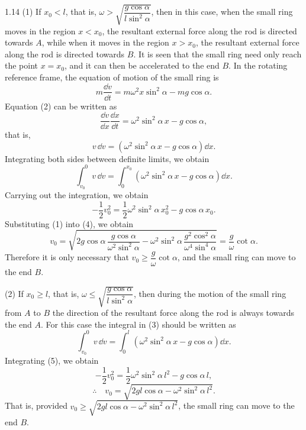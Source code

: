 \begin{solution}{1.14}
(1) If $x_0<l$, that is, $\omega>\sqrt{\dfrac{g\cos\alpha}{l\sin^2\alpha}}$, then in this case, when the small ring moves in the region $x<x_0$, the resultant external force along the rod is directed towards $A$, while when it moves in the region $x>x_0$, the resultant external force along the rod is directed towards $B$. It is seen that the small ring need only reach the point $x=x_0$, and it can then be accelerated to the end $B$. In the rotating reference frame, the equation of motion of the small ring is
\begin{equation}
m\frac{\dd v}{\dd t}=m\omega^2x\sin^2\alpha-mg\cos\alpha. \tag{2}
\end{equation}
Equation (2) can be written as
\[
\frac{\dd v}{\dd x}\frac{\dd x}{\dd t}=\omega^2\sin^2\alpha\,x-g\cos\alpha,
\]
that is,
\[
v\,\dd v=\left(\omega^2\sin^2\alpha\,x-g\cos\alpha\right)\dd x.
\]
Integrating both sides between definite limits, we obtain
\begin{equation}
\int_{v_0}^{0}v\,\dd v=\int_{0}^{x_0}\left(\omega^2\sin^2\alpha\,x-g\cos\alpha\right)\dd x. \tag{3}
\end{equation}
Carrying out the integration, we obtain
\begin{equation}
-\frac{1}{2}v_0^2=\frac{1}{2}\omega^2\sin^2\alpha\,x_0^2-g\cos\alpha\,x_0. \tag{4}
\end{equation}
Substituting (1) into (4), we obtain
\[
v_0=\sqrt{2g\cos\alpha\,\frac{g\cos\alpha}{\omega^2\sin^2\alpha}-\omega^2\sin^2\alpha\,\frac{g^2\cos^2\alpha}{\omega^4\sin^4\alpha}}
=\frac{g}{\omega}\cot\alpha.
\]
Therefore it is only necessary that $v_0\geq\dfrac{g}{\omega}\cot\alpha$, and the small ring can move to the end $B$.

(2) If $x_0\geq l$, that is, $\omega\leq\sqrt{\dfrac{g\cos\alpha}{l\sin^2\alpha}}$, then during the motion of the small ring from $A$ to $B$ the direction of the resultant force along the rod is always towards the end $A$. For this case the integral in (3) should be written as
\begin{equation}
\int_{v_0}^{0}v\,\dd v=\int_{0}^{l}\left(\omega^2\sin^2\alpha\,x-g\cos\alpha\right)\dd x. \tag{5}
\end{equation}
Integrating (5), we obtain
\[
-\frac{1}{2}v_0^2=\frac{1}{2}\omega^2\sin^2\alpha\,l^2-g\cos\alpha\,l,
\]
\[
\therefore\quad v_0=\sqrt{2gl\cos\alpha-\omega^2\sin^2\alpha\,l^2}.
\]
That is, provided $v_0\geq\sqrt{2gl\cos\alpha-\omega^2\sin^2\alpha\,l^2}$, the small ring can move to the end $B$.


\end{solution}
